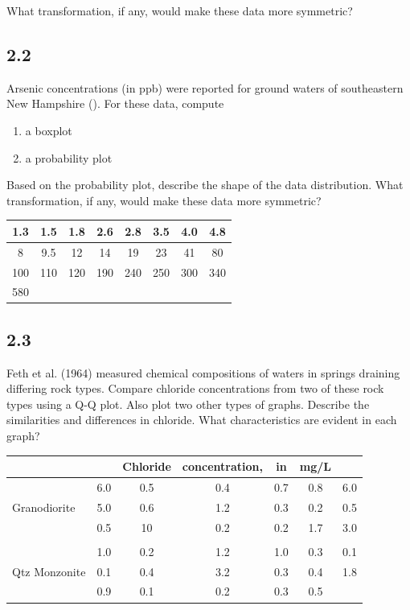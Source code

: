 \documentclass[]{book}
\providecommand{\tightlist}{%
  \setlength{\itemsep}{0pt}\setlength{\parskip}{0pt}}
\begin{document}
What transformation, if any, would make these data more symmetric?

\hypertarget{section-4}{%
\subsection*{2.2}\label{section-4}}

Arsenic concentrations (in ppb) were reported for ground waters of southeastern New Hampshire (\citet{boudette_high_1985}). For these data, compute

\begin{enumerate}
\def\labelenumi{\alph{enumi}.}
\tightlist
\item
  a boxplot
\item
  a probability plot
\end{enumerate}

Based on the probability plot, describe the shape of the data distribution. What transformation, if any, would make these data more symmetric?

\begin{longtable}[]{@{}cccccccc@{}}
\toprule
1.3 & 1.5 & 1.8 & 2.6 & 2.8 & 3.5 & 4.0 & 4.8\tabularnewline
\midrule
\endhead
8 & 9.5 & 12 & 14 & 19 & 23 & 41 & 80\tabularnewline
100 & 110 & 120 & 190 & 240 & 250 & 300 & 340\tabularnewline
580 & & & & & & &\tabularnewline
\bottomrule
\end{longtable}

\hypertarget{section-5}{%
\subsection*{2.3}\label{section-5}}

Feth et al. (1964) measured chemical compositions of waters in springs draining differing rock types. Compare chloride concentrations from two of these rock types using a Q-Q plot. Also plot two other types of graphs. Describe the similarities and differences in chloride. What characteristics are evident in each graph?

\begin{longtable}[]{@{}lcccccc@{}}
\toprule
& & Chloride & concentration, & in & mg/L &\tabularnewline
\midrule
\endhead
& 6.0 & 0.5 & 0.4 & 0.7 & 0.8 & 6.0\tabularnewline
Granodiorite & 5.0 & 0.6 & 1.2 & 0.3 & 0.2 & 0.5\tabularnewline
& 0.5 & 10 & 0.2 & 0.2 & 1.7 & 3.0\tabularnewline
& & & & & &\tabularnewline
& 1.0 & 0.2 & 1.2 & 1.0 & 0.3 & 0.1\tabularnewline
Qtz Monzonite & 0.1 & 0.4 & 3.2 & 0.3 & 0.4 & 1.8\tabularnewline
& 0.9 & 0.1 & 0.2 & 0.3 & 0.5 &\tabularnewline
\bottomrule
\end{longtable}
\end{document}
